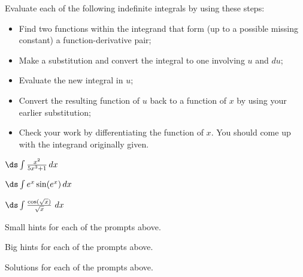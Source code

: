 \begin{activity} \label{A:5.3.2}  Evaluate each of the following indefinite integrals by using these steps:
\begin{itemize}
  \item Find two functions within the integrand that form (up to a possible missing constant) a function-derivative pair;
  \item Make a substitution and convert the integral to one involving $u$ and $du$;
  \item Evaluate the new integral in $u$;
  \item Convert the resulting function of $u$ back to a function of $x$ by using your earlier substitution;
  \item Check your work by differentiating the function of $x$.  You should come up with the integrand originally given.
\end{itemize}

\ba
	\item $\ds \int \frac{x^2}{5x^3+1} \, dx$
	\item $\ds \int e^x \sin(e^x) \, dx$
	\item $\ds \int \frac{\cos(\sqrt{x})}{\sqrt{x}}~dx$
\ea
\end{activity}
\begin{smallhint}
\ba
	\item Small hints for each of the prompts above.
\ea
\end{smallhint}
\begin{bighint}
\ba
	\item Big hints for each of the prompts above.
\ea
\end{bighint}
\begin{activitySolution}
\ba
	\item Solutions for each of the prompts above.
\ea
\end{activitySolution}
\aftera
